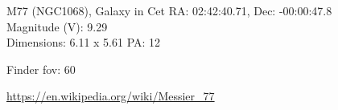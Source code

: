 \begin{block}{M77 (NGC1068), Galaxy in Cet}
    RA: 02:42:40.71, Dec: -00:00:47.8 \\ 
    Magnitude (V): 9.29 \\ 
    Dimensions: 6.11 x 5.61 PA: 12 

    Finder fov: 60 

    \url{https://en.wikipedia.org/wiki/Messier_77} 
\end{block}
